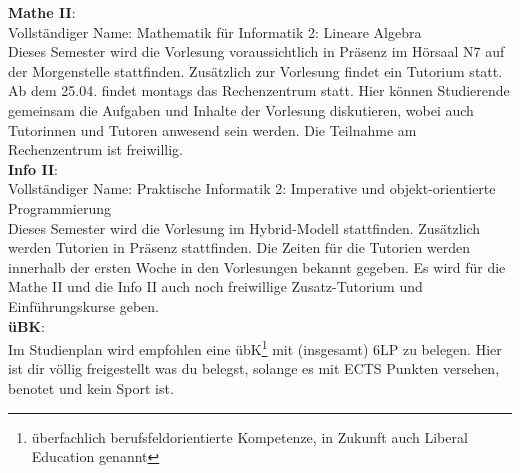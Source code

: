 \textbf{Mathe II}:\\
Vollständiger Name: Mathematik für Informatik 2: Lineare Algebra\\
Dieses Semester wird die Vorlesung voraussichtlich in Präsenz im Hörsaal N7 auf der Morgenstelle stattfinden.
Zusätzlich zur Vorlesung findet ein Tutorium statt. \\
Ab dem 25.04. findet montags das Rechenzentrum statt. Hier können Studierende gemeinsam die Aufgaben und Inhalte der Vorlesung diskutieren,
wobei auch Tutorinnen und Tutoren anwesend sein werden. Die Teilnahme am Rechenzentrum ist freiwillig.\\

\textbf{Info II}:\\
Vollständiger Name: Praktische Informatik 2: Imperative und objekt-orientierte Programmierung\\
Dieses Semester wird die Vorlesung im Hybrid-Modell stattfinden. Zusätzlich werden Tutorien in Präsenz stattfinden.
Die Zeiten für die Tutorien werden innerhalb der ersten Woche in den Vorlesungen bekannt gegeben.
Es wird für die Mathe II und die Info II auch noch freiwillige Zusatz-Tutorium und Einführungskurse geben.\\

\textbf{üBK}:\\
Im Studienplan wird empfohlen eine übK\footnote{überfachlich berufsfeldorientierte Kompetenze, in Zukunft auch Liberal Education genannt}
mit (insgesamt) 6LP zu belegen. Hier ist dir völlig freigestellt was du belegst, solange es mit ECTS Punkten versehen, benotet und kein Sport ist.\\
